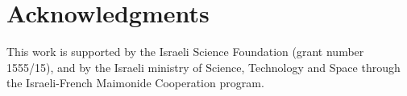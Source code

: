 \documentclass[11pt,a4paper]{article}
\begin{document}
	\section*{Acknowledgments}
	
	This work is supported by the Israeli Science Foundation (grant number 1555/15), and by the Israeli ministry of Science, Technology and Space through the Israeli-French Maimonide Cooperation program.
							
	
	
	
	
	
	
\end{document}
